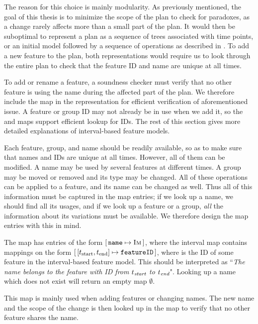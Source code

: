 The reason for this choice is mainly modularity. As previously mentioned, the goal of this thesis is to minimize the scope of the plan to check for paradoxes, as a change rarely affects more than a small part of the plan. It would then be suboptimal to represent a plan as a sequence of trees associated with time points, or an initial model followed by a sequence of operations as described in  \parencite{art:consistency-preserving-evolution-planning}. To add a new feature to the plan, both representations would require us to look through the entire plan to check that the feature ID and name are unique at all times.

To add or rename a feature, a soundness checker must verify that no other feature is using the name during the affected part of the plan. We therefore include the \names{} map in the representation for efficient verification of aforementioned issue. A feature or group ID may not already be in use when we add it, so the \features{} and \groups{} maps support efficient lookup for IDs. The rest of this section gives more detailed explanations of interval-based feature models.

Each feature, group, and name should be readily available, so as to make sure that names and IDs are unique at all times. However, all of them can be modified. A name may be used by several features at different times. A group may be moved or removed and its type may be changed. All of these operations can be applied to a feature, and its name can be changed as well. Thus all of this information must be captured in the map entries; if we look up a name, we should find all its usages, and if we look up a feature or a group, \emph{all} the information about its variations must be available. We therefore design the map entries with this in mind.

The \names{} map has entries of the form $[ \,\texttt{name} \mapsto \textsc{Im}\, ]$, where the interval map  contains mappings on the form $\intervalmapping{t_\text{start}}{t_\text{end}}{\var{featureID}}$, where  is the ID of some feature in the interval-based feature model. This should be interpreted as ``\emph{The name \emph{} belongs to the feature with ID \emph{} from $t_{\emph{\text{start}}}$ to $t_{\emph{\text{end}}}$}". Looking up a name which does not exist will return an empty map $\emptyset$. 

This map is mainly used when adding features or changing names. The new name and the scope of the change is then looked up in the \names{} map to verify that no other feature shares the name.

